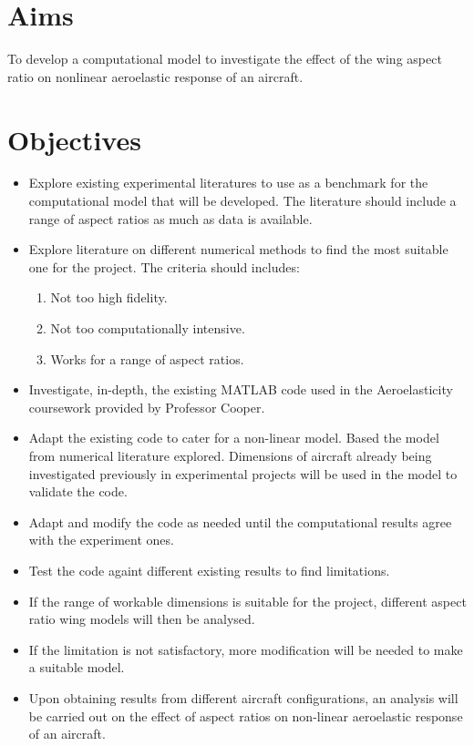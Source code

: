 \documentclass[11pt]{article}
\begin{document}
\section*{Aims}
To develop a computational model to investigate the effect of the wing aspect ratio on nonlinear aeroelastic response of an aircraft. 

\section*{Objectives} 
\begin{itemize}
    \item Explore existing experimental literatures to use as a benchmark for the computational model that will be developed. The literature should include a range of aspect ratios as much as data is available.
    \item Explore literature on different numerical methods to find the most suitable one for the project. The criteria should includes:
    \begin{enumerate}
        \item Not too high fidelity.
        \item Not too computationally intensive.
        \item Works for a range of aspect ratios.
    \end{enumerate}
    \item Investigate, in-depth, the existing MATLAB code used in the Aeroelasticity coursework provided by Professor Cooper.
    \item Adapt the existing code to cater for a non-linear model. Based the model from numerical literature explored. Dimensions of aircraft already being investigated previously in experimental projects will be used in the model to validate the code.
   \item Adapt and modify the code as needed until the computational results agree with the experiment ones.
    \item Test the code againt different existing results to find limitations.
    \item If the range of workable dimensions is suitable for the project, different aspect ratio wing models will then be analysed.
    \item If the limitation is not satisfactory, more modification will be needed to make a suitable model.
    \item Upon obtaining results from different aircraft configurations, an analysis will be carried out on the effect of aspect ratios on non-linear aeroelastic response of an aircraft.
    
\end{itemize}
\end{document}
